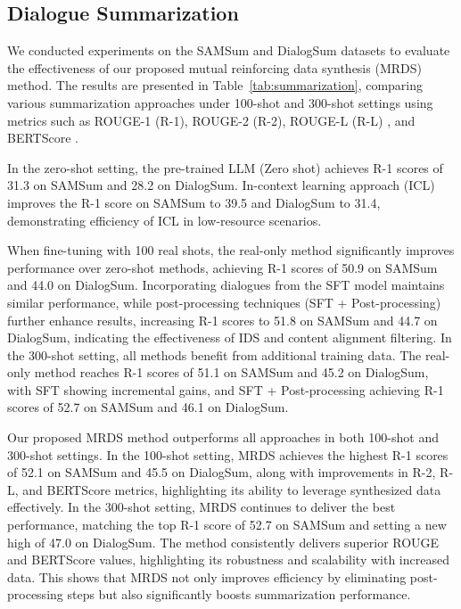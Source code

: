 \subsection{Dialogue Summarization}
We conducted experiments on the SAMSum and DialogSum datasets to evaluate the effectiveness of our proposed mutual reinforcing data synthesis (MRDS) method. The results are presented in Table~\ref{tab:summarization}, comparing various summarization approaches under 100-shot and 300-shot settings using metrics such as ROUGE-1 (R-1), ROUGE-2 (R-2), ROUGE-L (R-L) \citep{lin-2004-rouge}, and BERTScore \citep{bert-score}.

In the zero-shot setting, the pre-trained LLM (Zero shot) achieves R-1 scores of 31.3 on SAMSum and 28.2 on DialogSum. In-context learning approach (ICL) improves the R-1 score on SAMSum to 39.5 and DialogSum to 31.4, demonstrating efficiency of ICL in low-resource scenarios.

When fine-tuning with 100 real shots, the real-only method significantly improves performance over zero-shot methods, achieving R-1 scores of 50.9 on SAMSum and 44.0 on DialogSum. 
Incorporating dialogues from the SFT model maintains similar performance, while post-processing techniques (SFT + Post-processing) further enhance results, increasing R-1 scores to 51.8 on SAMSum and 44.7 on DialogSum, indicating the effectiveness of IDS and content alignment filtering. 
In the 300-shot setting, all methods benefit from additional training data. 
The real-only method reaches R-1 scores of 51.1 on SAMSum and 45.2 on DialogSum, with {SFT} showing incremental gains, and {SFT + Post-processing} achieving R-1 scores of 52.7 on SAMSum and 46.1 on DialogSum.

Our proposed MRDS method outperforms all approaches in both 100-shot and 300-shot settings. 
In the 100-shot setting, MRDS achieves the highest R-1 scores of 52.1 on SAMSum and 45.5 on DialogSum, along with improvements in R-2, R-L, and BERTScore metrics, highlighting its ability to leverage synthesized data effectively. 
In the 300-shot setting, MRDS continues to deliver the best performance, matching the top R-1 score of 52.7 on SAMSum and setting a new high of 47.0 on DialogSum. 
The method consistently delivers superior ROUGE and BERTScore values, highlighting its robustness and scalability with increased data. This shows that MRDS not only improves efficiency by eliminating post-processing steps but also significantly boosts summarization performance.



